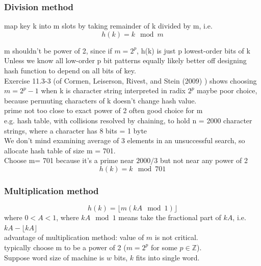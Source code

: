 \documentclass[10pt]{amsart}
\begin{document}
\begin{multicols*}{2}
\subsubsection{Division method}

map key k into m slots by taking remainder of k divided by m, i.e. 
\begin{equation}
h(k) = k \mod{m}
\end{equation}

m shouldn't be power of 2, since if $m=2^p$, h(k) is just p lowest-order bits of k \\
Unless we know all low-order p bit patterns equally likely better off designing hash function to depend on all bits of key. \\
Exercise 11.3-3 (of Cormen, Leiserson, Rivest, and Stein (2009) \cite{CLRS2009}) shows choosing $m=2^p - 1$ when k is character string interpreted in radix $2^p$ maybe poor choice, because permuting characters of k doesn't change hash value. \\

prime not too close to exact power of 2 often good choice for m \\
e.g. hash table, with collisions resolved by chaining, to hold n = 2000 character strings, where a character has 8 bits = 1 byte \\
We don't mind examining average of 3 elements in an unsuccessful search, so allocate hash table of size m = 701.  \\
Choose m= 701 because it's a prime near $2000/3$ but not near any power of 2
\begin{equation}
h(k) = k \mod{701}
\end{equation}

\subsubsection{Multiplication method}

\[
h(k) = \lfloor m (kA \mod{1}) \rfloor
\]
where $0 < A < 1$, where $kA \mod{1}$ means take the fractional part of $kA$, i.e. $kA - \lfloor kA \rfloor$ \\

advantage of multiplication method: value of $m$ is not critical. \\
typically choose m to be a power of 2 ($m = 2^p$ for some $p \in \mathbb{Z}$). \\

Suppose word size of machine is $w$ bits, $k$ fits into single word. \\


\end{multicols*}
\end{document}
